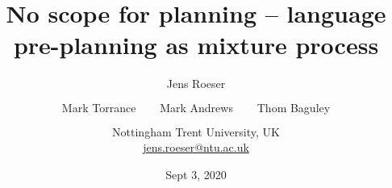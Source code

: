 \documentclass{slides}
\title[]{ No scope for planning -- language pre-planning as mixture process }
\author{\small Jens Roeser \\ $\phantom{foo}$ \\ Mark Torrance $\phantom{foo}$ Mark Andrews $\phantom{foo}$ Thom Baguley \\$\phantom{foo}$ \\ Nottingham Trent University, UK \\ \url{jens.roeser@ntu.ac.uk} }
\institute{26th AMLaP, University of Potsdam}
\date{Sept 3, 2020}
\begin{document}
\frame{\titlepage}






	
	
	
	
	
	
	
	
		
	
	
	
	
	
\end{document}
